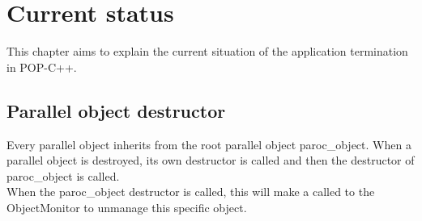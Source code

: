 \section{Current status}
\label{current_status}
This chapter aims to explain the current situation of the application termination in POP-C++. 

\subsection{Parallel object destructor}
Every parallel object inherits from the root parallel object paroc\_object. When a parallel object is destroyed, its own destructor is called and then the destructor of paroc\_object is called. \\
When the paroc\_object destructor is called, this will make a called to the ObjectMonitor to unmanage this specific object. 
